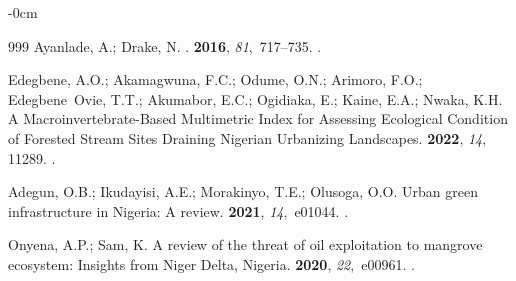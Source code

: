 \documentclass[jmse,article,accept,pdftex,moreauthors]{Definitions/mdpi}
\begin{document}
\begin{adjustwidth}{-\extralength}{0cm}
\begin{thebibliography}{999}
Ayanlade, A.; Drake, N.
.
 {\bf 2016}, {\em 81},~717--735.
.

Edegbene, A.O.; Akamagwuna, F.C.; Odume, O.N.; Arimoro, F.O.; Edegbene~Ovie,
  T.T.; Akumabor, E.C.; Ogidiaka, E.; Kaine, E.A.; Nwaka, K.H.
\newblock A Macroinvertebrate-Based Multimetric Index for Assessing Ecological
  Condition of Forested Stream Sites Draining Nigerian Urbanizing Landscapes.
 {\bf 2022}, {\em 14}, 11289.
.

Adegun, O.B.; Ikudayisi, A.E.; Morakinyo, T.E.; Olusoga, O.O.
\newblock Urban green infrastructure in Nigeria: A review.
 {\bf 2021}, {\em 14},~e01044.
.

Onyena, A.P.; Sam, K.
\newblock A review of the threat of oil exploitation to mangrove ecosystem:
  Insights from Niger Delta, Nigeria.
 {\bf 2020}, {\em 22},~e00961.
.

\end{thebibliography}


\PublishersNote{}
\end{adjustwidth}
\end{document}
